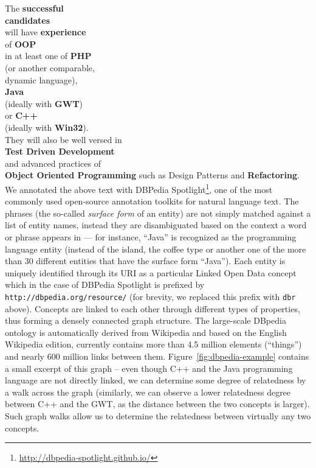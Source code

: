 \documentclass[conference]{IEEEtran}
\begin{document}
{\small
\noindent The \textbf{successful} \\ \textbf{candidates}  \\
will have \textbf{experience} \\
of \textbf{OOP} \\
  in at least one of \textbf{PHP} \\ 
  (or another comparable,\\
  dynamic language), \\ 
  \textbf{Java} \\
  (ideally with \textbf{GWT}) \\
  or \textbf{C++} \\
  (ideally with \textbf{Win32}). \\
They will also be well versed in\\
\textbf{Test Driven Development} \\
and advanced practices of\\ 
{\footnotesize\textbf{Object Oriented Programming}}  such as Design Patterns and \textbf{Refactoring}.   
}
\vspace{0.5cm}\\
We annotated the above text with DBPedia Spotlight\footnote{\url{http://dbpedia-spotlight.github.io/}}, one of the most commonly used open-source annotation toolkits for natural language text. The phrases (the so-called \emph{surface form} of an entity) are not simply matched against a list of entity names, instead they are disambiguated based on the context a word or phrase appears in --- for instance, ``Java'' is recognized as the programming language entity (instead of the island, the coffee type or another one of the more than 30 different entities that have the surface form ``Java''). Each entity is uniquely identified through its URI as a particular Linked Open Data concept which in the case of DBPedia Spotlight is prefixed by \texttt{http://dbpedia.org/resource/} (for brevity, we replaced this prefix with \texttt{dbr} above). 
Concepts are linked to each other through different types of properties, thus forming a densely connected graph structure. The large-scale DBpedia ontology is automatically derived from Wikipedia and based on the English Wikipedia edition, currently contains more than 4.5 million elements (``things'') and nearly 600 million links between them. Figure~\ref{fig:dbpedia-example} contains a small excerpt of this graph -- even though C++ and the Java programming language are not directly linked, we can determine some degree of relatedness by a walk across the graph (similarly, we can observe a lower relatedness degree between C++ and the GWT, as the distance between the two concepts is larger). Such graph walks allow us to determine the relatedness between virtually any two concepts.
\end{document}
